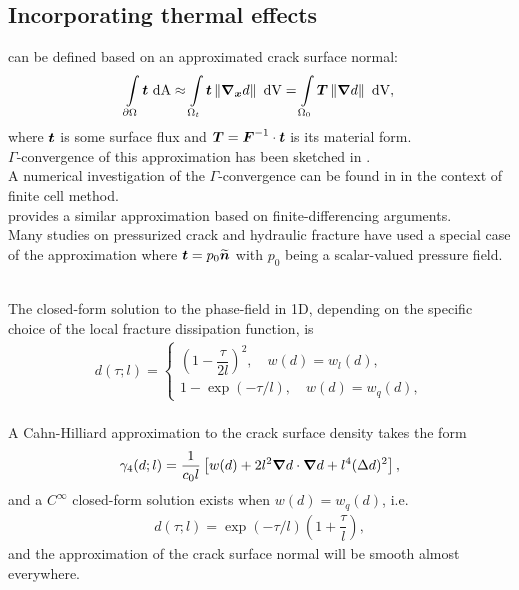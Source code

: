 \subsection{Incorporating thermal effects}

\subsectioncover

\begin{frame}{}
 can be defined based on an approximated crack surface normal:
\begin{align}
    \int\limits_{\partial \Omega} \boldsymbol{t} \text{ dA} \approx \int\limits_{\Omega_t} \boldsymbol{t} \left\lVert\boldsymbol{\nabla}_{\boldsymbol{x}} d\right\rVert \text{ dV} = \int\limits_{\Omega_0} \boldsymbol{T} \left\lVert\boldsymbol{\nabla} d\right\rVert \text{ dV},
\end{align}
where $\boldsymbol{t}$ is some surface flux and $\boldsymbol{T} = \boldsymbol{F}^{-1} \cdot \boldsymbol{t}$ is its material form. \\
\bigskip
$\Gamma$-convergence of this approximation has been sketched in \cite{chukwudozie2019variational}. \\
\bigskip
A numerical investigation of the $\Gamma$-convergence can be found in \cite{nguyen2017phase} in the context of finite cell method. \\
\bigskip
\cite{miehe2015phase} provides a similar approximation based on finite-differencing arguments. \\
\bigskip
Many studies on pressurized crack and hydraulic fracture have used a special case of the approximation where $\boldsymbol{t} = p_0\widetilde{\boldsymbol{n}}$ with $p_0$ being a scalar-valued pressure field.
\end{frame}

\begin{frame}{}
 \\
The closed-form solution to the phase-field in 1D, depending on the specific choice of the local fracture dissipation function, is
\begin{align}
    d(\tau; l) =
    \begin{cases}
        \left( 1 - \dfrac{\tau}{2l} \right)^2, \quad w(d) = w_l(d), \\
        1-\exp(-\tau/l), \quad w(d) = w_q(d),
    \end{cases}
\end{align} \\
\bigskip
A Cahn-Hilliard approximation to the crack surface density takes the form
\begin{align}
    \gamma_4(d; l) = \dfrac{1}{c_0 l} \left[ w(d) + 2 l^2 \boldsymbol{\nabla} d \cdot \boldsymbol{\nabla} d + l^4 (\Delta d)^2 \right],
\end{align}
and a $C^\infty$ closed-form solution exists when $w(d) = w_q(d)$, i.e.
\begin{align}
    d(\tau; l) = \exp(-\tau/l) \left( 1 + \dfrac{\tau}{l} \right),
\end{align}
and the approximation of the crack surface normal will be smooth almost everywhere.
\end{frame}

